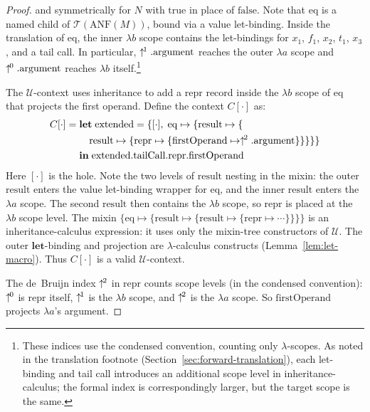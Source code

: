 \begin{proof}
  and symmetrically for $N$ with $\mathrm{true}$ in place
  of $\mathrm{false}$.
  Note that $\mathrm{eq}$ is a named child
  of $\mathcal{T}(\mathrm{ANF}(M))$, bound via a value
  let-binding.
  Inside the translation of $\mathrm{eq}$, the inner
  $\lambda b$ scope contains the let-bindings
  for $x_1$, $f_1$, $x_2$, $t_1$, $x_3$, and a tail call.
  In particular, $\uparrow^{\!1}.\mathrm{argument}$ reaches
  the outer $\lambda a$ scope and
  $\uparrow^{\!0}.\mathrm{argument}$ reaches $\lambda b$
  itself.\footnote{
    These indices use the condensed
    convention, counting only $\lambda$-scopes.
    As noted in the translation footnote
    (Section~\ref{sec:forward-translation}),
    each let-binding and tail call introduces an
    additional scope level in inheritance-calculus;
    the formal index is correspondingly larger,
    but the target scope is the same.
  }

  The $\mathscr{U}$-context uses inheritance to add
  a $\mathrm{repr}$ record inside the $\lambda b$ scope
  of $\mathrm{eq}$ that projects the first operand.
  Define the context $C[\cdot]$ as:
  \begin{align*}
    C[\cdot] ={} & \mathbf{let}\;
    \mathrm{extended} = \{[\cdot],\;
      \mathrm{eq} \mapsto \{
        \mathrm{result} \mapsto \{ \\
          &\quad
          \mathrm{result} \mapsto \{
            \mathrm{repr} \mapsto \{
              \mathrm{firstOperand}
              \mapsto \uparrow^{\!2}.\mathrm{argument}
    \}\}\}\}\} \\
    & \mathbf{in}\;
    \mathrm{extended}.\mathrm{tailCall}.\mathrm{repr}.\mathrm{firstOperand}
  \end{align*}
  Here $[\cdot]$ is the hole.
  Note the two levels of $\mathrm{result}$ nesting in the
  mixin: the outer $\mathrm{result}$ enters the value
  let-binding wrapper for $\mathrm{eq}$, and the inner
  $\mathrm{result}$ enters the $\lambda a$ scope.
  The second $\mathrm{result}$ then contains the
  $\lambda b$ scope, so $\mathrm{repr}$ is placed at
  the $\lambda b$ scope level.
  The mixin $\{\mathrm{eq} \mapsto \{\mathrm{result}
      \mapsto \{\mathrm{result} \mapsto
  \{\mathrm{repr} \mapsto \cdots\}\}\}\}$ is an
  inheritance-calculus expression: it uses only the
  mixin-tree constructors of $\mathscr{U}$.
  The outer $\mathbf{let}$-binding and projection are
  $\lambda$-calculus constructs (Lemma~\ref{lem:let-macro}).
  Thus $C[\cdot]$ is a valid $\mathscr{U}$-context.

  The de~Bruijn index $\uparrow^{\!2}$ in
  $\mathrm{repr}$ counts scope levels
  (in the condensed convention):
  $\uparrow^{\!0}$ is $\mathrm{repr}$ itself,
  $\uparrow^{\!1}$ is the $\lambda b$ scope, and
  $\uparrow^{\!2}$ is the $\lambda a$ scope.
  So $\mathrm{firstOperand}$ projects
  $\lambda a$'s argument.


\end{proof}
